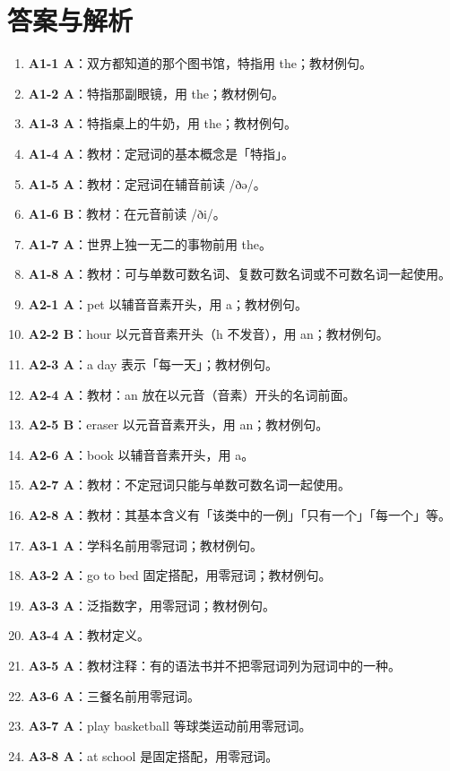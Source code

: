 \documentclass[11pt,a4paper]{ctexart}
\begin{document}
\section*{答案与解析}
\small
\begin{enumerate}[leftmargin=1.6em,itemsep=2pt]
\item \textbf{A1-1 A}：双方都知道的那个图书馆，特指用 the；教材例句。
\item \textbf{A1-2 A}：特指那副眼镜，用 the；教材例句。
\item \textbf{A1-3 A}：特指桌上的牛奶，用 the；教材例句。
\item \textbf{A1-4 A}：教材：定冠词的基本概念是「特指」。
\item \textbf{A1-5 A}：教材：定冠词在辅音前读 /ðə/。
\item \textbf{A1-6 B}：教材：在元音前读 /ði/。
\item \textbf{A1-7 A}：世界上独一无二的事物前用 the。
\item \textbf{A1-8 A}：教材：可与单数可数名词、复数可数名词或不可数名词一起使用。
\item \textbf{A2-1 A}：pet 以辅音音素开头，用 a；教材例句。
\item \textbf{A2-2 B}：hour 以元音音素开头（h 不发音），用 an；教材例句。
\item \textbf{A2-3 A}：a day 表示「每一天」；教材例句。
\item \textbf{A2-4 A}：教材：an 放在以元音（音素）开头的名词前面。
\item \textbf{A2-5 B}：eraser 以元音音素开头，用 an；教材例句。
\item \textbf{A2-6 A}：book 以辅音音素开头，用 a。
\item \textbf{A2-7 A}：教材：不定冠词只能与单数可数名词一起使用。
\item \textbf{A2-8 A}：教材：其基本含义有「该类中的一例」「只有一个」「每一个」等。
\item \textbf{A3-1 A}：学科名前用零冠词；教材例句。
\item \textbf{A3-2 A}：go to bed 固定搭配，用零冠词；教材例句。
\item \textbf{A3-3 A}：泛指数字，用零冠词；教材例句。
\item \textbf{A3-4 A}：教材定义。
\item \textbf{A3-5 A}：教材注释：有的语法书并不把零冠词列为冠词中的一种。
\item \textbf{A3-6 A}：三餐名前用零冠词。
\item \textbf{A3-7 A}：play basketball 等球类运动前用零冠词。
\item \textbf{A3-8 A}：at school 是固定搭配，用零冠词。

\end{enumerate}
\end{document}
